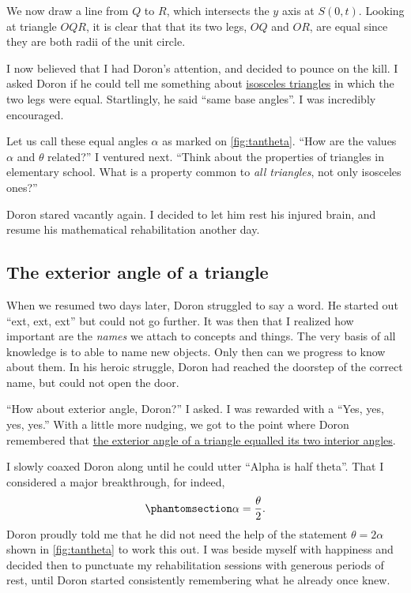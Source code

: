 \documentclass[
  a4paper,
]{article}
\begin{document}
We now draw a line from \(Q\) to \(R\), which intersects the \(y\) axis
at \(S(0, t)\). Looking at triangle \(OQR\), it is clear that that its
two legs, \(OQ\) and \(OR\), are equal since they are both radii of the
unit circle.

I now believed that I had Doron's attention, and decided to pounce on
the kill. I asked Doron if he could tell me something about
\href{https://en.wikipedia.org/wiki/Isosceles_triangle}{isosceles
triangles} in which the two legs were equal. Startlingly, he said ``same
base angles''. I was incredibly encouraged.

Let us call these equal angles \(\alpha\) as marked on
\cref{fig:tantheta}. ``How are the values \(\alpha\) and \(\theta\)
related?'' I ventured next. ``Think about the properties of triangles in
elementary school. What is a property common to \emph{all triangles},
not only isosceles ones?''

Doron stared vacantly again. I decided to let him rest his injured
brain, and resume his mathematical rehabilitation another day.

\subsection{The exterior angle of a
triangle}\label{the-exterior-angle-of-a-triangle}

When we resumed two days later, Doron struggled to say a word. He
started out ``ext, ext, ext'' but could not go further. It was then that
I realized how important are the \emph{names} we attach to concepts and
things. The very basis of all knowledge is to able to name new objects.
Only then can we progress to know about them. In his heroic struggle,
Doron had reached the doorstep of the correct name, but could not open
the door.

``How about exterior angle, Doron?'' I asked. I was rewarded with a
``Yes, yes, yes, yes.'' With a little more nudging, we got to the point
where Doron remembered that
\href{https://www.storyofmathematics.com/exterior-angle-theorem/}{the
exterior angle of a triangle equalled its two interior angles}.

I slowly coaxed Doron along until he could utter ``Alpha is half
theta''. That I considered a major breakthrough, for indeed,
\begin{equation}\phantomsection\label{eq:alpha}{
\alpha = \frac{\theta}{2}.
}\end{equation} Doron proudly told me that he did not need the help of
the statement \(\theta = 2\alpha\) shown in \cref{fig:tantheta} to work
this out. I was beside myself with happiness and decided then to
punctuate my rehabilitation sessions with generous periods of rest,
until Doron started consistently remembering what he already once knew.
\end{document}

